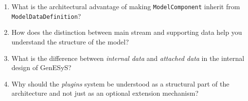 \begin{enumerate}
 \item What is the architectural advantage of making \texttt{ModelComponent} inherit from \texttt{ModelDataDefinition}?

\item How does the distinction between main stream and supporting data help you understand the structure of the model?

\item What is the difference between \textit{internal data} and \textit{attached data} in the internal design of GenESyS?

\item Why should the \textit{plugins} system be understood as a structural part of the architecture and not just as an optional extension mechanism?
\end{enumerate}
